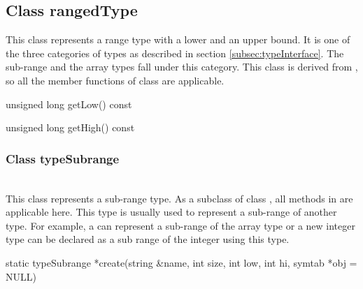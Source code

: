 \subsection{Class rangedType}
This class represents a range type with a lower and an upper bound. It is one of the three categories of types as described in section \ref{subsec:typeInterface}. The sub-range and the array types fall under this category. This class is derived from , so all the member functions of class  are applicable.


\begin{apient}
unsigned long getLow() const
\end{apient}

\begin{apient}
unsigned long getHigh() const
\end{apient}

\subsubsection{Class typeSubrange}
\mbox{ }\\

This class represents a sub-range type. As a subclass of class , all methods in  are applicable here. This type is usually used to represent a sub-range of another type. For example, a  can represent a sub-range of the array type or a new integer type can be declared as a sub range of the integer using this type.


\begin{apient}
static typeSubrange *create(string &name,
                            int size,
                            int low,
                            int hi, 
                            symtab *obj = NULL) 
\end{apient}

